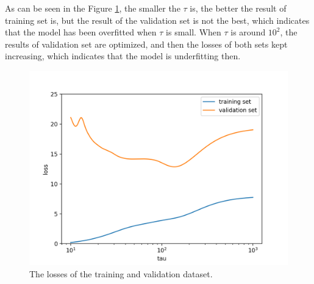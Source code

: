 \documentclass{myhw}
\begin{document}
\begin{homeworkProblem}
\begin{homeworkSection}
As can be seen in the Figure \ref{fig:q2.2}, the smaller the $\tau$ is, the better the result of training set is, but the result of the validation set is not the best, which indicates that the model has been overfitted when $\tau$ is small.
When $\tau$ is around $10^2$, the results of validation set are optimized, and then the losses of both sets kept increasing, which indicates that the model is underfitting then.
\begin{figure}[h]
  \centering
  \includegraphics[width=.7\textwidth]{q2.png} 
  \caption{The losses of the training and validation dataset. }
  \label{fig:q2.2}
\end{figure}
\end{homeworkSection}
\end{homeworkProblem}
\end{document}
